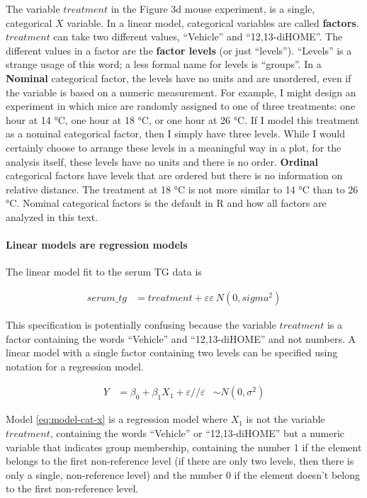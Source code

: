 \documentclass[]{book}
\let\oldparagraph\paragraph
\renewcommand{\paragraph}[1]{\oldparagraph{#1}\mbox{}}
\begin{document}
The variable \(treatment\) in the Figure 3d mouse experiment, is a single, categorical \(X\) variable. In a linear model, categorical variables are called \textbf{factors}. \(treatment\) can take two different values, ``Vehicle'' and ``12,13-diHOME''. The different values in a factor are the \textbf{factor levels} (or just ``levels''). ``Levels'' is a strange usage of this word; a less formal name for levels is ``groups''. In a \textbf{Nominal} categorical factor, the levels have no units and are unordered, even if the variable is based on a numeric measurement. For example, I might design an experiment in which mice are randomly assigned to one of three treatments: one hour at 14 °C, one hour at 18 °C, or one hour at 26 °C. If I model this treatment as a nominal categorical factor, then I simply have three levels. While I would certainly choose to arrange these levels in a meaningful way in a plot, for the analysis itself, these levels have no units and there is no order. \textbf{Ordinal} categorical factors have levels that are ordered but there is no information on relative distance. The treatment at 18 °C is not more similar to 14 °C than to 26 °C. Nominal categorical factors is the default in R and how all factors are analyzed in this text.

\hypertarget{linear-models-are-regression-models}{%
\paragraph{Linear models are regression models}\label{linear-models-are-regression-models}}

The linear model fit to the serum TG data is

\begin{align}
serum\_tg &= treatment + \varepsilon
\varepsilon ~ N(0, sigma^2)
\label{eq:lm-serum-tg}
\end{align}

This specification is potentially confusing because the variable \(treatment\) is a factor containing the words ``Vehicle'' and ``12,13-diHOME'' and not numbers. A linear model with a single factor containing two levels can be specified using notation for a regression model.

\begin{align}
Y &= \beta_0 + \beta_1 X_1 + \varepsilon//
\varepsilon &\sim N(0, \sigma^2)
\label{eq:model-cat-x}
\end{align}

Model \eqref{eq:model-cat-x} is a regression model where \(X_1\) is not the variable \(treatment\), containing the words ``Vehicle'' or ``12,13-diHOME'' but a numeric variable that indicates group membership, containing the number 1 if the element belongs to the first non-reference level (if there are only two levels, then there is only a single, non-reference level) and the number 0 if the element doesn't belong to the first non-reference level.
\end{document}
